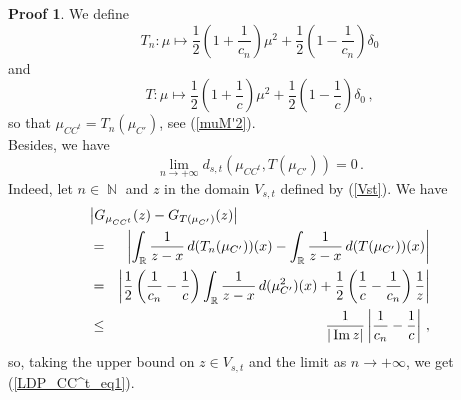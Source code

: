 \documentclass[11pt,a4paper]{article}
\DeclareMathOperator{\N}{\mathbb{N}}
\DeclareMathOperator{\R}{\mathbb{R}}
\DeclareMathOperator{\1}{\mathbf{1}}
\DeclareMathOperator{\Imag}{\mathrm{Im}}
\theoremstyle{definition}
\newtheorem*{Proof}{Proof}
\begin{document}
\begin{Proof}
We define
\begin{displaymath}
T_n : \mu \mapsto \frac12 \left( 1+\frac{1}{c_n} \right) \mu^2 + \frac12 \left( 1-\frac{1}{c_n} \right) \delta_0
\end{displaymath}
and
\begin{displaymath}
T : \mu \mapsto \frac12 \left( 1+\frac1c \right) \mu^2 + \frac12 \left( 1-\frac1c \right) \delta_0 \, ,
\end{displaymath}
so that $\mu_{CC^t} = T_n(\mu_{C'})$, see (\ref{muM'2}).\\

Besides, we have
\begin{equation} \label{LDP_CC^t_eq1}
\lim_{n \to +\infty} d_{s,t}(\mu_{CC^t}, T(\mu_{C'})) = 0 \, .
\end{equation}
Indeed, let $n \in \N$ and $z$ in the domain $V_{s,t}$ defined by (\ref{Vst}). We have
\begin{eqnarray*}
\lefteqn{   \left| G_{\mu_{CC^t}}(z) - G_{T(\mu_{C'})}(z) \right|   } \\
& = & \left| \int_{\R} \frac{1}{z-x} \, d(T_n(\mu_{C'}))(x) - \int_{\R} \frac{1}{z-x} \, d(T(\mu_{C'}))(x) \right| \\
& = & \left| \frac12 \left( \frac{1}{c_n} - \frac1c \right) \int_{\R} \frac{1}{z-x} \, d(\mu_{C'}^2)(x) + \frac12 \left( \frac1c - \frac{1}{c_n} \right) \frac1z \right| \\
& \le & \frac{1}{|\Imag z|} \left| \frac{1}{c_n} - \frac1c \right| \, ,
\end{eqnarray*}
so, taking the upper bound on $z \in V_{s,t}$ and the limit as $n \to +\infty$, we get (\ref{LDP_CC^t_eq1}).\\


\end{Proof}
\end{document}
